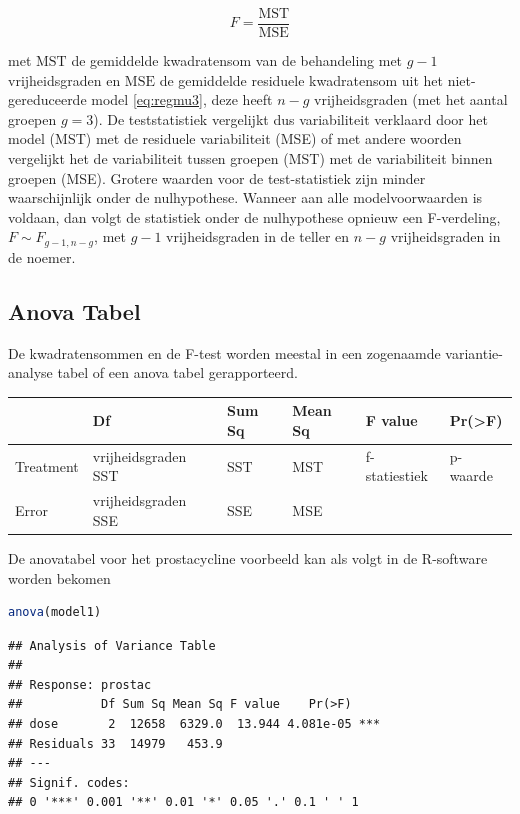 \documentclass[
  12pt,dutch,coursenotes]{book}
\begin{document}
\[F = \frac{\text{MST}}{\text{MSE}}\]

met \(\text{MST}\) de gemiddelde kwadratensom van de behandeling met \(g-1\) vrijheidsgraden en \(\text{MSE}\) de gemiddelde residuele kwadratensom uit het niet-gereduceerde model \eqref{eq:regmu3}, deze heeft \(n-g\) vrijheidsgraden (met het aantal groepen \(g=3\)).
De teststatistiek vergelijkt dus variabiliteit verklaard door het model (MST) met de residuele variabiliteit (MSE) of met andere woorden vergelijkt het de
variabiliteit tussen groepen (MST) met de variabiliteit binnen groepen (MSE).
Grotere waarden voor de test-statistiek zijn minder waarschijnlijk onder de nulhypothese.
Wanneer aan alle modelvoorwaarden is voldaan, dan volgt de statistiek onder de nulhypothese opnieuw een F-verdeling, \(F \sim F_{g-1,n-g}\), met \(g-1\) vrijheidsgraden in de teller en \(n-g\) vrijheidsgraden in de noemer.

\hypertarget{anova-tabel-1}{%
\subsection{Anova Tabel}\label{anova-tabel-1}}

De kwadratensommen en de F-test worden meestal in een zogenaamde variantie-analyse tabel of een anova tabel gerapporteerd.

\begin{tabular}{l|l|l|l|l|l}
\hline
  & Df & Sum Sq & Mean Sq & F value & Pr(>F)\\
\hline
Treatment & vrijheidsgraden SST & SST & MST & f-statiestiek & p-waarde\\
\hline
Error & vrijheidsgraden SSE & SSE & MSE &  & \\
\hline
\end{tabular}

De anovatabel voor het prostacycline voorbeeld kan als volgt in de R-software worden bekomen

\begin{lstlisting}[language=R]
anova(model1)
\end{lstlisting}

\begin{lstlisting}
## Analysis of Variance Table
## 
## Response: prostac
##           Df Sum Sq Mean Sq F value    Pr(>F)    
## dose       2  12658  6329.0  13.944 4.081e-05 ***
## Residuals 33  14979   453.9                      
## ---
## Signif. codes:  
## 0 '***' 0.001 '**' 0.01 '*' 0.05 '.' 0.1 ' ' 1
\end{lstlisting}
\end{document}

